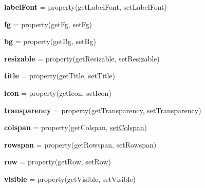 \begin{DoxyCompactItemize}
\item 
\mbox{\label{class_python_01_g_u_i_1_1appjar_1_1gui_aa6a9e7c2b0e3fcebc20ea3d1e4e8c4c8}} 
{\bfseries label\+Font} = property(get\+Label\+Font, set\+Label\+Font)
\item 
\mbox{\label{class_python_01_g_u_i_1_1appjar_1_1gui_a405aebf4ab6f9dd90bb9c369ec4c76f9}} 
{\bfseries fg} = property(get\+Fg, set\+Fg)
\item 
\mbox{\label{class_python_01_g_u_i_1_1appjar_1_1gui_ad7ec04874c382eac22974c4634727c59}} 
{\bfseries bg} = property(get\+Bg, set\+Bg)
\item 
\mbox{\label{class_python_01_g_u_i_1_1appjar_1_1gui_a20355d1e2bfa53fda7fbedd2b18abbf0}} 
{\bfseries resizable} = property(get\+Resizable, set\+Resizable)
\item 
\mbox{\label{class_python_01_g_u_i_1_1appjar_1_1gui_aadd7814b5c579282708e149b8f8f957d}} 
{\bfseries title} = property(get\+Title, set\+Title)
\item 
\mbox{\label{class_python_01_g_u_i_1_1appjar_1_1gui_aba0fc7de2bc62fb0f7a4581809f6d032}} 
{\bfseries icon} = property(get\+Icon, set\+Icon)
\item 
\mbox{\label{class_python_01_g_u_i_1_1appjar_1_1gui_ab5ad4b1d33a42fa4f7301e932804ecdf}} 
{\bfseries transparency} = property(get\+Transparency, set\+Transparency)
\item 
\mbox{\label{class_python_01_g_u_i_1_1appjar_1_1gui_a0700b1bcff094186e04299ac27b1639f}} 
{\bfseries colspan} = property(get\+Colspan, \hyperlink{class_python_01_g_u_i_1_1appjar_1_1gui_a42e117ae97d9e09474b1c394ae647306}{set\+Colspan})
\item 
\mbox{\label{class_python_01_g_u_i_1_1appjar_1_1gui_a199352a3d9884723624a50e41a3a48a9}} 
{\bfseries rowspan} = property(get\+Rowspan, set\+Rowspan)
\item 
\mbox{\label{class_python_01_g_u_i_1_1appjar_1_1gui_ac3279dd470e36a27907247f2202a8e4c}} 
{\bfseries row} = property(get\+Row, set\+Row)
\item 
\mbox{\label{class_python_01_g_u_i_1_1appjar_1_1gui_afb6ceca712c03f663ef3ac3807907a76}} 
{\bfseries visible} = property(get\+Visible, set\+Visible)
\end{DoxyCompactItemize}



